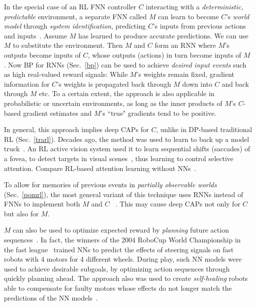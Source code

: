 \documentclass[letterpaper]{article}
\begin{document}
\begin{sloppypar}
In the special case of an RL FNN controller 
$C$ interacting with a 
{\em deterministic, predictable} environment, 
a separate FNN called $M$ 
can learn to become $C$'s {\em world model} through {\em system identification},
predicting $C$'s inputs from previous actions and inputs~\citep[e.g.,][]{Werbos:81sensitivity,Werbos:87,Munro:87,Jordan:88,Werbos:89identification,Werbos:89neurocontrol,RobinsonFallside:89,JordanRumelhart:90,Schmidhuber:90sandiego,narendra1990,Werbos:92sticky,kawato1993,cochocki1993,levin1995,miller1995,ljung1998,prokhorov2001,ge2010}.
Assume $M$ has learned to produce accurate predictions.
We can use $M$ to substitute the environment.
Then $M$ and $C$ form an RNN where $M$'s outputs become inputs of $C$, 
whose outputs (actions) in turn become inputs of $M$.
Now BP  for RNNs (Sec.~\ref{bp}) can be used 
to achieve {\em desired input events}  such as high real-valued reward signals:
While $M$'s weights remain fixed,
gradient information for $C$'s weights is propagated
back through $M$ down into $C$ and
back through $M$ etc. 
To a certain extent, the approach is also applicable in probabilistic or uncertain environments, as long as the inner products of $M$'s $C$-based gradient estimates and $M$'s ``true" gradients tend to be positive. 

In general, this approach
 implies deep CAPs for $C$, unlike in DP-based traditional  RL (Sec.~\ref{trarl}).
Decades ago, the method was used to
 learn to back up a model truck~\citep{NguyenWidrow:89}.
An RL active vision system used it to learn sequential shifts (saccades) of a fovea, to
detect targets in visual scenes~\citep{SchmidhuberHuber:91},
thus learning to control selective attention.
Compare RL-based attention learning without NNs~\citep{Whitehead:92}.


To allow for memories of previous events in
{\em partially observable worlds}
 (Sec.~\ref{pomrl}),
the most general variant of this technique uses 
RNNs instead of FNNs to implement both $M$ and $C$ ~\citep{Schmidhuber:90sandiego,Schmidhuber:91nips,feldkamp1998}.
This may cause deep CAPs not only for $C$ but also for $M$.

$M$ can also be used to optimize expected reward by {\em planning} future action sequences~\citep{Schmidhuber:90sandiego}.
In fact, the winners of the 2004 RoboCup World Championship in the fast league~\citep{egorova03}
trained NNs to predict the effects of steering signals on fast
robots with 4 motors for 4 different wheels. During play, such NN models were used 
to achieve desirable subgoals, 
by optimizing action sequences through quickly planning ahead. The approach also
was used to create {\em self-healing} robots able to compensate for faulty motors whose effects do not longer 
match the predictions of the NN models~\citep{gloye05,schmidhuber2007pro}. 


\end{sloppypar}
\end{document}
